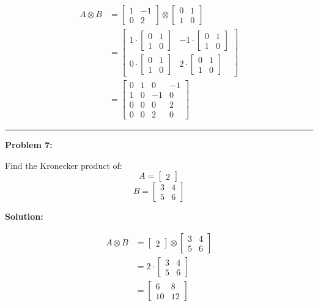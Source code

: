\documentclass[
  letterpaper,
  DIV=11,
  numbers=noendperiod]{scrreprt}
\theoremstyle{plain}
\theoremstyle{definition}
\theoremstyle{remark}
\begin{document}
\begin{align*}
A \otimes B &= \begin{bmatrix}1&-1\\0&2\end{bmatrix} \otimes \begin{bmatrix}0&1\\1&0\end{bmatrix} \\
&= \begin{bmatrix}
1 \cdot \begin{bmatrix}0&1\\1&0\end{bmatrix} & -1 \cdot \begin{bmatrix}0&1\\1&0\end{bmatrix} \\
0 \cdot \begin{bmatrix}0&1\\1&0\end{bmatrix} & 2 \cdot \begin{bmatrix}0&1\\1&0\end{bmatrix}
\end{bmatrix} \\
&= \begin{bmatrix}
0 & 1 & 0 & -1 \\
1 & 0 & -1 & 0 \\
0 & 0 & 0 & 2 \\
0 & 0 & 2 & 0
\end{bmatrix}
\end{align*}

\begin{center}\rule{0.5\linewidth}{0.5pt}\end{center}

\textbf{Problem 7:}

Find the Kronecker product of: \[A=\begin{bmatrix}2\end{bmatrix}\]
\[B=\begin{bmatrix}3&4\\5&6\end{bmatrix}\]

\textbf{Solution:}

\begin{align*}
A \otimes B &= \begin{bmatrix}2\end{bmatrix} \otimes \begin{bmatrix}3&4\\5&6\end{bmatrix} \\
&= 2 \cdot \begin{bmatrix}3&4\\5&6\end{bmatrix} \\
&= \begin{bmatrix}
6 & 8 \\
10 & 12
\end{bmatrix}
\end{align*}
\end{document}
